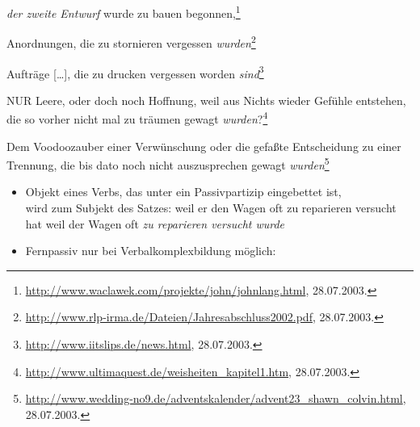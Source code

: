 \ex
\emph{der zweite Entwurf} wurde zu bauen begonnen,\footnote{
\url{http://www.waclawek.com/projekte/john/johnlang.html}, 28.07.2003.
}
\zl

\eal
\ex Anordnungen, die zu stornieren vergessen \emph{wurden}\footnote{
        \url{http://www.rlp-irma.de/Dateien/Jahresabschluss2002.pdf}, 28.07.2003.
}

\ex Aufträge [\ldots], die zu drucken vergessen worden \emph{sind}\footnote{
        \url{http://www.iitslips.de/news.html}, 28.07.2003.
}
\zl

\eal
\ex NUR Leere, oder doch noch Hoffnung, weil aus Nichts wieder Gefühle entstehen,
    die so vorher nicht mal zu träumen gewagt \emph{wurden}?\footnote{
        \url{http://www.ultimaquest.de/weisheiten_kapitel1.htm}, 28.07.2003.
}

\ex Dem Voodoozauber einer Verwünschung oder die gefaßte Entscheidung zu einer Trennung,
    die bis dato noch nicht auszusprechen gewagt \emph{wurden}\footnote{
        \url{http://www.wedding-no9.de/adventskalender/advent23_shawn_colvin.html}, 28.07.2003.
}
\zl
%





\begin{itemize}
\item Objekt eines Verbs, das unter ein Passivpartizip eingebettet ist,\\
wird zum Subjekt des Satzes:
\eal
\ex weil er den Wagen oft zu reparieren versucht hat
\ex weil der Wagen oft \emph<2>{zu reparieren versucht wurde}
\zl

\item Fernpassiv nur bei Verbalkomplexbildung möglich:
\eal
{}

\zl
\end{itemize}



